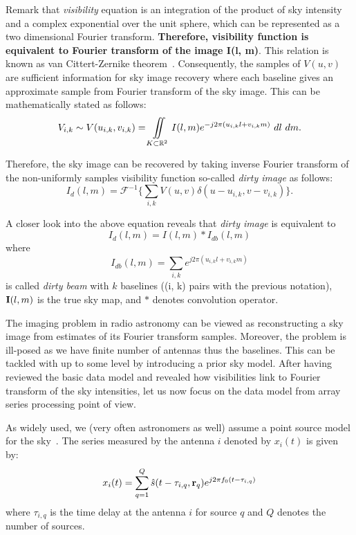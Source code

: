 \documentclass{article}
\begin{document}
Remark that {\it{visibility}} equation is an integration of the product of sky intensity and a complex exponential over the unit sphere, which can be represented as a two dimensional Fourier transform. {\bf{Therefore, {{visibility}} function is equivalent to Fourier transform of the image I(l, m\bf )}}. This relation is known as van Cittert-Zernike theorem~\cite{perley1999ra}.  Consequently, the samples of $V(u,v)$ are sufficient information for sky image recovery where each baseline gives an approximate sample from Fourier transform of the sky image. This can be mathematically stated as follows:
\begin{equation}\label{visibility equation}
V_{i,k} \sim V(u_{i,k}, v_{i,k}) = \iint\displaylimits_{K\subset \mathbb{R}^2} {I}(l, m)e^{-j2\pi (u_{i,k}l+v_{i,k}m)}\ dl\ dm.
\end{equation}

Therefore, the sky image can be recovered by taking inverse Fourier transform of the non-uniformly samples visibility function so-called {\it dirty image} as follows:
\begin{equation}
I_d(l, m) = \mathcal{F}^{-1}\Big \{ \sum_{i, k} V(u, v) \delta (u-u_{i,k}, v-v_{i,k}) \Big \}.\label{meas_eq_non_beam}
\end{equation}

A closer look into the above equation reveals that {\it dirty image} is equivalent to
\begin{equation}\label{dirty_image}
I_d(l, m) = I(l, m)\ast I_{db}(l, m) 
\end{equation}
where 
\begin{equation}\label{dirty_beam}
I_{db}(l, m)= \sum_{i, k} e^{j2\pi(u_{i, k}l+v_{i, k}m)}
\end{equation}
is called {\it dirty beam} with $k$ baselines ((i, k) pairs with the previous notation), ${\bf I}(l, m)$ is the true sky map,  and $\ast$ denotes convolution operator.

The imaging problem in radio astronomy can be viewed as reconstructing a sky image from estimates of its Fourier transform samples. Moreover, the problem is ill-posed as we have finite number of antennas thus the baselines. This can be tackled with up to some level by introducing a prior sky model. After having reviewed the basic data model and revealed how visibilities link to Fourier transform of the sky intensities, let us now focus on the data model from array series processing point of view. 
 
As widely used, we (very often astronomers as well) assume a point source model for the sky~\cite{veen2013ra, perley1999ra}. The series measured by the antenna $i$ denoted by $x_i(t)$ is given by:
 \begin{equation}\label{idare}
 x_i(t) = \sum_{q=1}^Q \hat{s}(t-\tau_{i,q},{\bf r}_q)e^{j2\pi f_0 (t-\tau_{i,q})}
 \end{equation} 
 where $\tau_{i,q}$ is the time delay at the antenna $i$ for source $q$ and $Q$ denotes the number of sources. 
 
\end{document}
